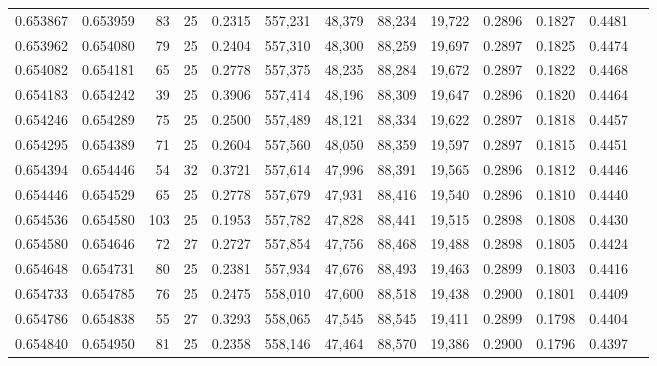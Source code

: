 \begin{tabular}{rrrrrrrrrrrrr}
0.653867 & 0.653959 &  83 &  25 &                                     0.2315 & 557,231 &  48,379 &  88,234 &  19,722 & 0.2896 & 0.1827 & 0.4481 \\
0.653962 & 0.654080 &  79 &  25 &                                     0.2404 & 557,310 &  48,300 &  88,259 &  19,697 & 0.2897 & 0.1825 & 0.4474 \\
0.654082 & 0.654181 &  65 &  25 &                                     0.2778 & 557,375 &  48,235 &  88,284 &  19,672 & 0.2897 & 0.1822 & 0.4468 \\
0.654183 & 0.654242 &  39 &  25 &                                     0.3906 & 557,414 &  48,196 &  88,309 &  19,647 & 0.2896 & 0.1820 & 0.4464 \\
0.654246 & 0.654289 &  75 &  25 &                                     0.2500 & 557,489 &  48,121 &  88,334 &  19,622 & 0.2897 & 0.1818 & 0.4457 \\
0.654295 & 0.654389 &  71 &  25 &                                     0.2604 & 557,560 &  48,050 &  88,359 &  19,597 & 0.2897 & 0.1815 & 0.4451 \\
0.654394 & 0.654446 &  54 &  32 &                                     0.3721 & 557,614 &  47,996 &  88,391 &  19,565 & 0.2896 & 0.1812 & 0.4446 \\
0.654446 & 0.654529 &  65 &  25 &                                     0.2778 & 557,679 &  47,931 &  88,416 &  19,540 & 0.2896 & 0.1810 & 0.4440 \\
0.654536 & 0.654580 & 103 &  25 &                                     0.1953 & 557,782 &  47,828 &  88,441 &  19,515 & 0.2898 & 0.1808 & 0.4430 \\
0.654580 & 0.654646 &  72 &  27 &                                     0.2727 & 557,854 &  47,756 &  88,468 &  19,488 & 0.2898 & 0.1805 & 0.4424 \\
0.654648 & 0.654731 &  80 &  25 &                                     0.2381 & 557,934 &  47,676 &  88,493 &  19,463 & 0.2899 & 0.1803 & 0.4416 \\
0.654733 & 0.654785 &  76 &  25 &                                     0.2475 & 558,010 &  47,600 &  88,518 &  19,438 & 0.2900 & 0.1801 & 0.4409 \\
0.654786 & 0.654838 &  55 &  27 &                                     0.3293 & 558,065 &  47,545 &  88,545 &  19,411 & 0.2899 & 0.1798 & 0.4404 \\
0.654840 & 0.654950 &  81 &  25 &                                     0.2358 & 558,146 &  47,464 &  88,570 &  19,386 & 0.2900 & 0.1796 & 0.4397 \\

\end{tabular}
